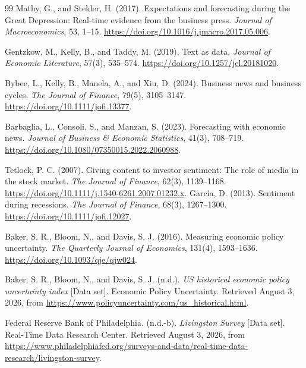 \documentclass[iicol,pdflatex,sn-mathphys-num]{sn-jnl}
\begin{document}
\FloatBarrier
\begingroup
\small
\setlength{\bibsep}{5pt}
\begin{thebibliography}{99}
Mathy, G., and Stekler, H. (2017).
Expectations and forecasting during the Great Depression: Real-time evidence from the business press.
\textit{Journal of Macroeconomics}, 53, 1--15.
\url{https://doi.org/10.1016/j.jmacro.2017.05.006}.

Gentzkow, M., Kelly, B., and Taddy, M. (2019).
Text as data. \textit{Journal of Economic Literature}, 57(3), 535--574.
\url{https://doi.org/10.1257/jel.20181020}.

Bybee, L., Kelly, B., Manela, A., and Xiu, D. (2024).
Business news and business cycles. \textit{The Journal of Finance}, 79(5), 3105--3147.
\url{https://doi.org/10.1111/jofi.13377}.

Barbaglia, L., Consoli, S., and Manzan, S. (2023). Forecasting with economic news. \textit{Journal of Business \& Economic Statistics}, 41(3), 708--719.
\url{https://doi.org/10.1080/07350015.2022.2060988}.

Tetlock, P. C. (2007). Giving content to investor sentiment: The role of media in the stock market. \textit{The Journal of Finance}, 62(3), 1139--1168.
\url{https://doi.org/10.1111/j.1540-6261.2007.01232.x}.
Garc\'{i}a, D. (2013). Sentiment during recessions. \textit{The Journal of Finance}, 68(3), 1267--1300.
\url{https://doi.org/10.1111/jofi.12027}.

Baker, S. R., Bloom, N., and Davis, S. J. (2016). Measuring economic policy uncertainty. \textit{The Quarterly Journal of Economics}, 131(4), 1593--1636.
\url{https://doi.org/10.1093/qje/qjw024}.

Baker, S. R., Bloom, N., and Davis, S. J. (n.d.). \textit{US historical economic policy uncertainty index} [Data set]. Economic Policy Uncertainty. Retrieved August 3, 2026, from
\url{https://www.policyuncertainty.com/us_historical.html}.

Federal Reserve Bank of Philadelphia. (n.d.-b). \textit{Livingston Survey} [Data set]. Real-Time Data Research Center. Retrieved August 3, 2026, from
\url{https://www.philadelphiafed.org/surveys-and-data/real-time-data-research/livingston-survey}.


\end{thebibliography}
\end{document}
